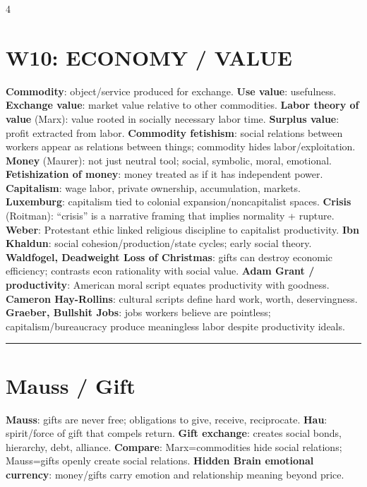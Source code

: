 \documentclass[10pt,landscape]{article}
\newcommand{\kw}[1]{\textbf{#1}}
\newcommand{\sep}{\vspace{0.8pt}\hrule\vspace{0.8pt}}
\begin{document}
\begin{multicols*}{4}
\section*{W10: ECONOMY / VALUE}
\kw{Commodity}: object/service produced for exchange. \kw{Use value}: usefulness. \kw{Exchange value}: market value relative to other commodities. \kw{Labor theory of value} (Marx): value rooted in socially necessary labor time. \kw{Surplus value}: profit extracted from labor. \kw{Commodity fetishism}: social relations between workers appear as relations between things; commodity hides labor/exploitation. \kw{Money} (Maurer): not just neutral tool; social, symbolic, moral, emotional. \kw{Fetishization of money}: money treated as if it has independent power. \kw{Capitalism}: wage labor, private ownership, accumulation, markets. \kw{Luxemburg}: capitalism tied to colonial expansion/noncapitalist spaces. \kw{Crisis} (Roitman): ``crisis'' is a narrative framing that implies normality + rupture. \kw{Weber}: Protestant ethic linked religious discipline to capitalist productivity. \kw{Ibn Khaldun}: social cohesion/production/state cycles; early social theory. \kw{Waldfogel, Deadweight Loss of Christmas}: gifts can destroy economic efficiency; contrasts econ rationality with social value. \kw{Adam Grant / productivity}: American moral script equates productivity with goodness. \kw{Cameron Hay-Rollins}: cultural scripts define hard work, worth, deservingness. \kw{Graeber, Bullshit Jobs}: jobs workers believe are pointless; capitalism/bureaucracy produce meaningless labor despite productivity ideals.
\sep
\section*{Mauss / Gift}
\kw{Mauss}: gifts are never free; obligations to give, receive, reciprocate. \kw{Hau}: spirit/force of gift that compels return. \kw{Gift exchange}: creates social bonds, hierarchy, debt, alliance. \kw{Compare}: Marx=commodities hide social relations; Mauss=gifts openly create social relations. \kw{Hidden Brain emotional currency}: money/gifts carry emotion and relationship meaning beyond price.


\end{multicols*}
\end{document}
